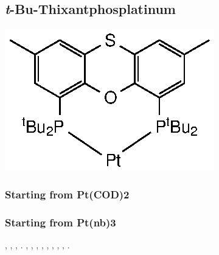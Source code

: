 \subsection*{\emph{t}-Bu-Thixantphosplatinum}
\begin{structure}[h]
\begin{center}
\includegraphics{../Structures/StBuPlatinum.eps}
\end{center}
\end{structure}

\subsubsection{Starting from Pt(COD)2}
\subsubsection{Starting from Pt(nb)3}

,
,
,
.
,
,
,
,
,
,
,
,
.



